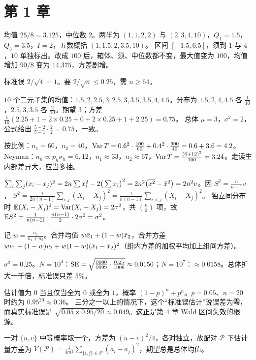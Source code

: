 \section*{第 1 章}

均值 $25/8=3.125$，中位数 $2$。两半为 $(1,1,2,2)$ 与 $(2,3,4,10)$，$Q_1=1.5$，$Q_3=3.5$，$I=2$，五数概括 $(1,1.5,2,3.5,10)$。
区间 $[-1.5,6.5]$，须到 $1$ 与 $4$，$10$ 单独标出。改成 $100$ 后，箱体、须、中位数都不变，最大值变为 $100$，均值增加 $90/8$ 变为 $14.375$，方差剧增。

标准误 $2/\sqrt4=1$。要 $2/\sqrt n\le0.25$，需 $n\ge64$。

$10$ 个二元子集的均值：$1.5,2,2.5,3,2.5,3,3.5,3.5,4,4.5$。分布为
$1.5,2,4,4.5$ 各 $\frac1{10}$，$2.5,3,3.5$ 各 $\frac2{10}$。期望 $3$；方差 $\frac{1}{10}(2.25+1+2\times0.25+0+2\times0.25+1+2.25)=0.75$。
总体 $\mu=3$，$\sigma^2=2$，公式给出 $\frac{5-2}{5-1}\cdot\frac22=0.75$，一致。

按比例：$n_1=60$，$n_2=40$，$\operatorname{Var} T=0.6^2\cdot\frac{100}{60}+0.4^2\cdot\frac{900}{40}=0.6+3.6=4.2$。
Neyman：$n_h\propto p_h\sigma_h=6,12$，$n_1\approx33$，$n_2\approx67$，$\operatorname{Var} T=\frac{(6+12)^2}{100}=3.24$。走读生内部差异大，应当多抽。

$\sum_i\sum_j(x_i-x_j)^2=2n\sum x_i^2-2\big(\sum x_i\big)^2=2n^2\big(\overline{x^2}-\bar{x}^2\big)=2n^2v$。因 $S^2=\frac{n}{n-1}v$，
$S^2=\frac{1}{2n(n-1)}\sum_{i,j}(X_i-X_j)^2=\frac{1}{n(n-1)}\sum_{i<j}(X_i-X_j)^2$。
独立同分布时 $\mathbb{E}(X_i-X_j)^2=\operatorname{Var}(X_i-X_j)=2\sigma^2$，共 $\binom n2$ 项，故 $\mathbb{E} S^2=\frac{1}{n(n-1)}\cdot\frac{n(n-1)}2\cdot2\sigma^2=\sigma^2$。

记 $w=\frac{n_1}{n_1+n_2}$。合并均值 $w\bar{x}_1+(1-w)\bar{x}_2$，合并方差 $wv_1+(1-w)v_2+w(1-w)(\bar{x}_1-\bar{x}_2)^2$（组内方差的加权平均加上组间方差）。

$\sigma^2=0.25$。$N=10^4$：$\operatorname{SE}=\sqrt{\frac{9000}{9999}\cdot\frac{0.25}{1000}}\approx0.0150$；$N=10^7$：$\approx0.0158$。总体扩大一千倍，标准误只差 5\%。

估计值为 $0$ 当且仅当全为 $0$ 或全为 $1$，概率 $(1-p)^n+p^n$。$p=0.05$、$n=20$ 时约为 $0.95^{20}\approx0.36$。
三分之一以上的情况下，这个“标准误估计”说误差为零，而真实标准误是 $\sqrt{0.05\times0.95/20}\approx0.049$。这正是第 4 章 Wald 区间失效的根源。

一对 $\{u,v\}$ 中等概率取一个，方差为 $(u-v)^2/4$，各对独立，故配对 $\mathcal P$ 下估计量方差为 $V(\mathcal P)=\frac{1}{4m^2}\sum_{\{i,j\}\in\mathcal P}(a_i-a_j)^2$，期望总是总体均值。


